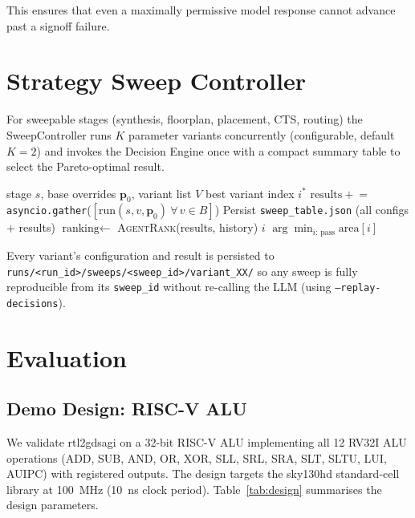 \documentclass[conference]{IEEEtran}
\begin{document}
This ensures that even a maximally permissive model response cannot
advance past a signoff failure.

\section{Strategy Sweep Controller}

For sweepable stages (synthesis, floorplan, placement, CTS, routing)
the SweepController runs $K$ parameter variants concurrently
(configurable, default $K\!=\!2$) and invokes the Decision Engine once
with a compact summary table to select the Pareto-optimal result.

\begin{algorithm}[t]
\caption{Strategy Sweep}
\label{alg:sweep}
\begin{algorithmic}[1]
\REQUIRE stage $s$, base overrides $\mathbf{p}_0$, variant list $V$
\ENSURE best variant index $i^*$
    \STATE $\text{results} \mathrel{+}=$ \texttt{asyncio.gather}($[\text{run}(s, v, \mathbf{p}_0)\ \forall\, v \in B]$)
\ENDFOR
\STATE Persist \texttt{sweep\_table.json} (all configs + results)
\STATE $\text{ranking} \leftarrow$ \textsc{AgentRank}(results, history)
    \RETURN $i$
\ELSE
    \RETURN $\arg\min_{i:\,\text{pass}} \text{area}[i]$  
\ENDIF
\end{algorithmic}
\end{algorithm}

Every variant's configuration and result is persisted to
\texttt{runs/<run\_id>/sweeps/<sweep\_id>/variant\_XX/} so any sweep
is fully reproducible from its \texttt{sweep\_id} without re-calling
the LLM (using \texttt{--replay-decisions}).

\section{Evaluation}

\subsection{Demo Design: RISC-V ALU}

We validate rtl2gdsagi on a 32-bit RISC-V ALU implementing all 12
RV32I ALU operations (ADD, SUB, AND, OR, XOR, SLL, SRL, SRA, SLT,
SLTU, LUI, AUIPC) with registered outputs.
The design targets the sky130hd standard-cell library at 100~MHz
(10~ns clock period).
Table~\ref{tab:design} summarises the design parameters.
\end{document}
